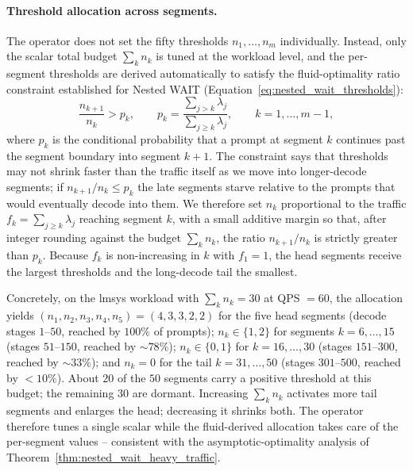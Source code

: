 \paragraph{Threshold allocation across segments.}
The operator does not set the fifty thresholds $n_1, \dots, n_m$ individually. Instead, only the scalar total budget $\sum_k n_k$ is tuned at the workload level, and the per-segment thresholds are derived automatically to satisfy the fluid-optimality ratio constraint established for Nested WAIT (Equation~\eqref{eq:nested_wait_thresholds}):
\[
\frac{n_{k+1}}{n_k} > p_k, \qquad p_k = \frac{\sum_{j > k} \lambda_j}{\sum_{j \geq k} \lambda_j}, \qquad k = 1, \dots, m-1,
\]
where $p_k$ is the conditional probability that a prompt at segment $k$ continues past the segment boundary into segment $k{+}1$. The constraint says that thresholds may not shrink faster than the traffic itself as we move into longer-decode segments; if $n_{k+1}/n_k \leq p_k$ the late segments starve relative to the prompts that would eventually decode into them. We therefore set $n_k$ proportional to the traffic $f_k = \sum_{j \geq k} \lambda_j$ reaching segment $k$, with a small additive margin so that, after integer rounding against the budget $\sum_k n_k$, the ratio $n_{k+1}/n_k$ is strictly greater than $p_k$. Because $f_k$ is non-increasing in $k$ with $f_1 = 1$, the head segments receive the largest thresholds and the long-decode tail the smallest.

Concretely, on the lmsys workload with $\sum_k n_k = 30$ at QPS $= 60$, the allocation yields $(n_1, n_2, n_3, n_4, n_5) = (4, 3, 3, 2, 2)$ for the five head segments (decode stages $1$--$50$, reached by $100\%$ of prompts); $n_k \in \{1, 2\}$ for segments $k = 6, \dots, 15$ (stages $51$--$150$, reached by ${\sim}78\%$); $n_k \in \{0, 1\}$ for $k = 16, \dots, 30$ (stages $151$--$300$, reached by ${\sim}33\%$); and $n_k = 0$ for the tail $k = 31, \dots, 50$ (stages $301$--$500$, reached by ${<}10\%$). About $20$ of the $50$ segments carry a positive threshold at this budget; the remaining $30$ are dormant. Increasing $\sum_k n_k$ activates more tail segments and enlarges the head; decreasing it shrinks both. The operator therefore tunes a single scalar while the fluid-derived allocation takes care of the per-segment values -- consistent with the asymptotic-optimality analysis of Theorem~\ref{thm:nested_wait_heavy_traffic}.

